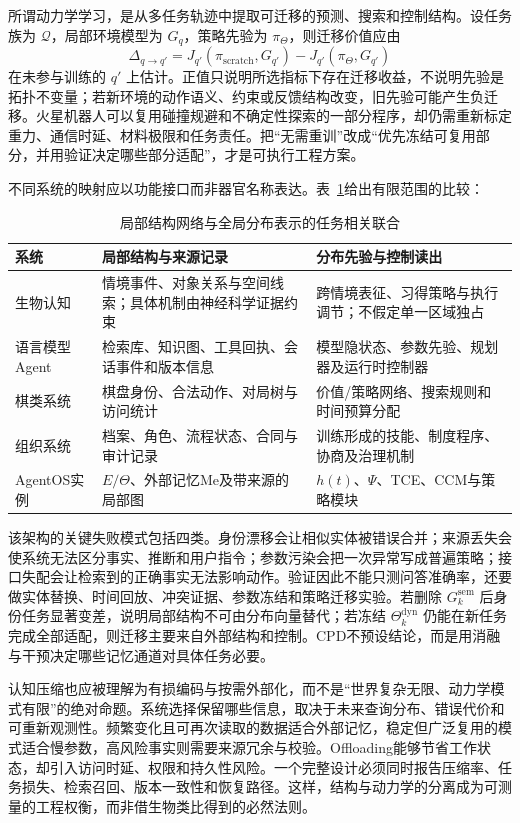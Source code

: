 所谓动力学学习，是从多任务轨迹中提取可迁移的预测、搜索和控制结构。设任务族为 $\mathcal{Q}$，局部环境模型为 $G_q$，策略先验为 $\pi_{\Theta}$，则迁移价值应由
\[
 \Delta_{q\to q'}=
 J_{q'}(\pi_{\mathrm{scratch}},G_{q'})-
 J_{q'}(\pi_{\Theta},G_{q'})
\]
在未参与训练的 $q'$ 上估计。正值只说明所选指标下存在迁移收益，不说明先验是拓扑不变量；若新环境的动作语义、约束或反馈结构改变，旧先验可能产生负迁移。火星机器人可以复用碰撞规避和不确定性探索的一部分程序，却仍需重新标定重力、通信时延、材料极限和任务责任。把“无需重训”改成“优先冻结可复用部分，并用验证决定哪些部分适配”，才是可执行工程方案。

不同系统的映射应以功能接口而非器官名称表达。表~\ref{tab:dual_memory_isomorphism}给出有限范围的比较：
\begin{table}[htbp]
\centering
\footnotesize
\renewcommand{\arraystretch}{1.35}
\begin{tabularx}{\textwidth}{l|X|X}
\toprule
\textbf{系统} & \textbf{局部结构与来源记录} & \textbf{分布先验与控制读出} \\
\midrule
生物认知 & 情境事件、对象关系与空间线索；具体机制由神经科学证据约束 & 跨情境表征、习得策略与执行调节；不假定单一区域独占 \\
语言模型Agent & 检索库、知识图、工具回执、会话事件和版本信息 & 模型隐状态、参数先验、规划器及运行时控制器 \\
棋类系统 & 棋盘身份、合法动作、对局树与访问统计 & 价值/策略网络、搜索规则和时间预算分配 \\
组织系统 & 档案、角色、流程状态、合同与审计记录 & 训练形成的技能、制度程序、协商及治理机制 \\
AgentOS实例 & $E/\Theta$、外部记忆Me及带来源的局部图 & $h(t)$、$\Psi$、TCE、CCM与策略模块 \\
\bottomrule
\end{tabularx}
\caption{局部结构网络与全局分布表示的任务相关联合}
\label{tab:dual_memory_isomorphism}
\end{table}

该架构的关键失败模式包括四类。身份漂移会让相似实体被错误合并；来源丢失会使系统无法区分事实、推断和用户指令；参数污染会把一次异常写成普遍策略；接口失配会让检索到的正确事实无法影响动作。验证因此不能只测问答准确率，还要做实体替换、时间回放、冲突证据、参数冻结和策略迁移实验。若删除 $G_k^{\mathrm{sem}}$ 后身份任务显著变差，说明局部结构不可由分布向量替代；若冻结 $\Theta_k^{\mathrm{dyn}}$ 仍能在新任务完成全部适配，则迁移主要来自外部结构和控制。CPD不预设结论，而是用消融与干预决定哪些记忆通道对具体任务必要。

认知压缩也应被理解为有损编码与按需外部化，而不是“世界复杂无限、动力学模式有限”的绝对命题。系统选择保留哪些信息，取决于未来查询分布、错误代价和可重新观测性。频繁变化且可再次读取的数据适合外部记忆，稳定但广泛复用的模式适合慢参数，高风险事实则需要来源冗余与校验。Offloading能够节省工作状态，却引入访问时延、权限和持久性风险。一个完整设计必须同时报告压缩率、任务损失、检索召回、版本一致性和恢复路径。这样，结构与动力学的分离成为可测量的工程权衡，而非借生物类比得到的必然法则。

